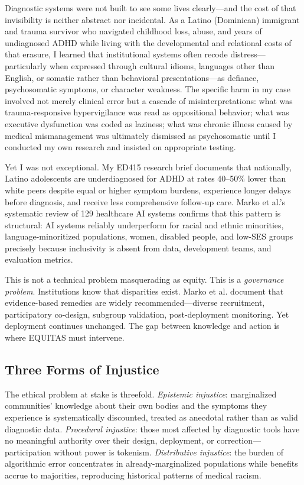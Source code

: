 \documentclass[12pt,a4paper]{article}
\begin{document}
Diagnostic systems were not built to see some lives clearly—and the cost of that invisibility is neither abstract nor incidental. As a Latino (Dominican) immigrant and trauma survivor who navigated childhood loss, abuse, and years of undiagnosed ADHD while living with the developmental and relational costs of that erasure, I learned that institutional systems often recode distress—particularly when expressed through cultural idioms, languages other than English, or somatic rather than behavioral presentations—as defiance, psychosomatic symptoms, or character weakness.\cite{garcia_ed415} The specific harm in my case involved not merely clinical error but a cascade of misinterpretations: what was trauma-responsive hypervigilance was read as oppositional behavior; what was executive dysfunction was coded as laziness; what was chronic illness caused by medical mismanagement was ultimately dismissed as psychosomatic until I conducted my own research and insisted on appropriate testing.\cite{garcia_ed415}

Yet I was not exceptional. My ED415 research brief documents that nationally, Latino adolescents are underdiagnosed for ADHD at rates 40--50\% lower than white peers despite equal or higher symptom burdens, experience longer delays before diagnosis, and receive less comprehensive follow-up care.\cite{garcia_ed415} Marko et al.'s systematic review of 129 healthcare AI systems confirms that this pattern is structural: AI systems reliably underperform for racial and ethnic minorities, language-minoritized populations, women, disabled people, and low-SES groups precisely because inclusivity is absent from data, development teams, and evaluation metrics.\cite{marko2025}

This is not a technical problem masquerading as equity. This is a \textit{governance problem}. Institutions know that disparities exist. Marko et al. document that evidence-based remedies are widely recommended—diverse recruitment, participatory co-design, subgroup validation, post-deployment monitoring.\cite{marko2025} Yet deployment continues unchanged. The gap between knowledge and action is where EQUITAS must intervene.

\subsection{Three Forms of Injustice}

The ethical problem at stake is threefold. \textit{Epistemic injustice}: marginalized communities' knowledge about their own bodies and the symptoms they experience is systematically discounted, treated as anecdotal rather than as valid diagnostic data.\cite{garcia_ed415} \textit{Procedural injustice}: those most affected by diagnostic tools have no meaningful authority over their design, deployment, or correction—participation without power is tokenism.\cite{nadarzynski2024} \textit{Distributive injustice}: the burden of algorithmic error concentrates in already-marginalized populations while benefits accrue to majorities, reproducing historical patterns of medical racism.\cite{marko2025}
\end{document}

